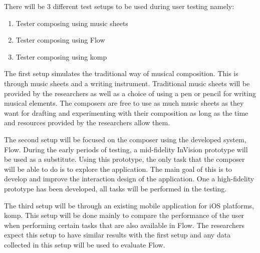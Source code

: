 There will be 3 different test setups to be used during user testing namely:

\begin{enumerate}
\item Tester composing using music sheets
\item Tester composing using Flow
\item Tester composing using komp
\end{enumerate}

The first setup simulates the traditional way of musical composition. This is through music sheets and a writing instrument. Traditional music sheets will be provided by the researchers as well as a choice of using a pen or pencil for writing musical elements. The composers are free to use as much music sheets as they want for drafting and experimenting with their composition as long as the time and resources provided by the researchers allow them.

The second setup will be focused on the composer using the developed system, Flow. During the early periods of testing, a mid-fidelity InVision prototype will be used as a substitute. Using this prototype, the only task that the composer will be able to do is to explore the application. The main goal of this is to develop and improve the interaction design of the application. One a high-fidelity prototype has been developed, all tasks will be performed in the testing.

The third setup will be through an existing mobile application for iOS platforms, komp. This setup will be done mainly to compare the performance of the user when performing certain tasks that are also available in Flow. The researchers expect this setup to have similar results with the first setup and any data collected in this setup will be used to evaluate Flow.